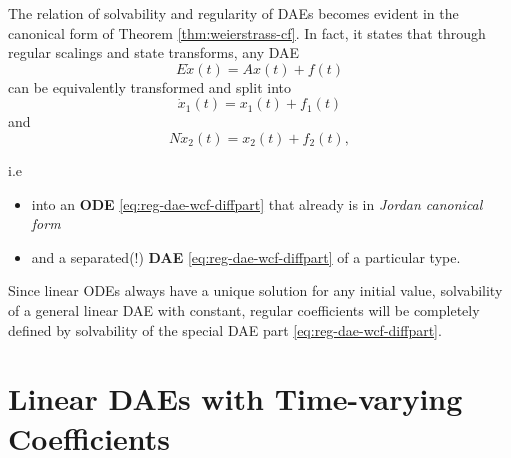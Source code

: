 \documentclass[]{book}
\providecommand{\tightlist}{%
  \setlength{\itemsep}{0pt}\setlength{\parskip}{0pt}}
\theoremstyle{definition}
\theoremstyle{definition}
\theoremstyle{definition}
\theoremstyle{remark}
\begin{document}
The relation of solvability and regularity of DAEs becomes evident in the canonical form of Theorem \ref{thm:weierstrass-cf}. In fact, it states that through regular scalings and state transforms, any DAE
\[
E\dot x(t) =  A x(t) + f(t)
\]
can be equivalently transformed and split into
\begin{equation}
\dot x_1(t) = x_1(t) + f_1(t) \label{eq:reg-dae-wcf-diffpart}
\end{equation}
and
\begin{equation}
N \dot x_2(t) = x_2(t) + f_2(t) \label{eq:reg-dae-wcf-algpart},
\end{equation}

i.e

\begin{itemize}
\tightlist
\item
  into an \textbf{ODE} \eqref{eq:reg-dae-wcf-diffpart} that already is in \emph{Jordan canonical form}
\item
  and a separated(!) \textbf{DAE} \eqref{eq:reg-dae-wcf-diffpart} of a particular type.
\end{itemize}

Since linear ODEs always have a unique solution for any initial value, solvability of a general linear DAE with constant, regular coefficients will be completely defined by solvability of the special DAE part \eqref{eq:reg-dae-wcf-diffpart}.

\newcommand{\rank}{\operatorname{rank}}
\newcommand{\kernel}{\operatorname{kernel}}
\newcommand{\corange}{\operatorname{corange}}
\newcommand{\range}{\operatorname{range}}
\newcommand{\cokernel}{\operatorname{cokernel}}

\hypertarget{linear-daes-with-time-varying-coefficients}{%
\chapter{Linear DAEs with Time-varying Coefficients}\label{linear-daes-with-time-varying-coefficients}}
\end{document}
